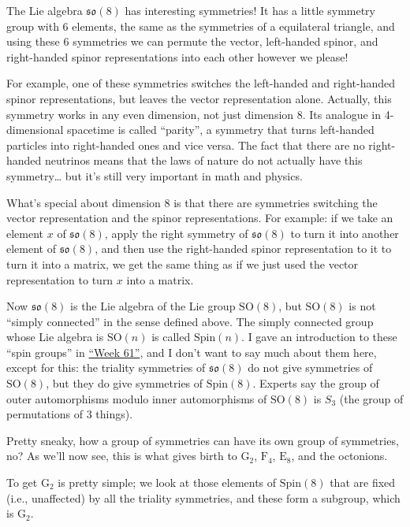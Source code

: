 \documentclass{article}
\begin{document}
The Lie algebra \(\mathfrak{so}(8)\) has interesting symmetries! It has
a little symmetry group with 6 elements, the same as the symmetries of a
equilateral triangle, and using these 6 symmetries we can permute the
vector, left-handed spinor, and right-handed spinor representations into
each other however we please!

For example, one of these symmetries switches the left-handed and
right-handed spinor representations, but leaves the vector
representation alone. Actually, this symmetry works in any even
dimension, not just dimension 8. Its analogue in 4-dimensional spacetime
is called ``parity'', a symmetry that turns left-handed particles into
right-handed ones and vice versa. The fact that there are no
right-handed neutrinos means that the laws of nature do not actually
have this symmetry\ldots{} but it's still very important in math and
physics.

What's special about dimension 8 is that there are symmetries switching
the vector representation and the spinor representations. For example:
if we take an element \(x\) of \(\mathfrak{so}(8)\), apply the right
symmetry of \(\mathfrak{so}(8)\) to turn it into another element of
\(\mathfrak{so}(8)\), and then use the right-handed spinor
representation to it to turn it into a matrix, we get the same thing as
if we just used the vector representation to turn \(x\) into a matrix.

Now \(\mathfrak{so}(8)\) is the Lie algebra of the Lie group
\(\mathrm{SO}(8)\), but \(\mathrm{SO}(8)\) is not ``simply connected''
in the sense defined above. The simply connected group whose Lie algebra
is \(\mathrm{SO}(n)\) is called \(\mathrm{Spin}(n)\). I gave an
introduction to these ``spin groups'' in
\protect\hyperlink{week61}{``Week 61''}, and I don't want to say much
about them here, except for this: the triality symmetries of
\(\mathfrak{so}(8)\) do not give symmetries of \(\mathrm{SO}(8)\), but
they do give symmetries of \(\mathrm{Spin}(8)\). Experts say the group
of outer automorphisms modulo inner automorphisms of \(\mathrm{SO}(8)\)
is \(S_3\) (the group of permutations of 3 things).

Pretty sneaky, how a group of symmetries can have its own group of
symmetries, no? As we'll now see, this is what gives birth to
\(\mathrm{G}_2\), \(\mathrm{F}_4\), \(\mathrm{E}_8\), and the octonions.

To get \(\mathrm{G}_2\) is pretty simple; we look at those elements of
\(\mathrm{Spin}(8)\) that are fixed (i.e., unaffected) by all the
triality symmetries, and these form a subgroup, which is
\(\mathrm{G}_2\).
\end{document}
